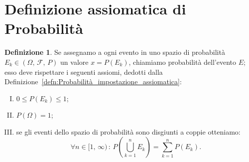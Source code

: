 \documentclass[12pt,openany]{amsbook}
\theoremstyle{plain}
\numberwithin{equation}{section} %
\theoremstyle{definition}
\newtheorem{defn}[thm]{Definizione}
\begin{document}
        \section{Definizione assiomatica di Probabilità}
            \begin{defn}
                Se assegnamo a ogni evento in uno spazio di probabilità $E_k \in (\Omega,\,\mathscr{F},\,P)$ un valore $x = P(E_k)$, chiamiamo probabilità dell'evento $E$; esso deve rispettare i seguenti assiomi, dedotti dalla Definizione~\ref{defn:Probabilità_impostazione_assiomatica}:
                \begin{enumerate}[I)]
                    \item $0 \leq P(E_k) \leq 1$;
                    \item $P(\Omega) = 1$;
                    \item  se gli eventi dello spazio di probabilità sono disgiunti a coppie otteniamo: \[
                    \forall n \in [1,\,\infty)\,:\,P(\bigcup_{k=1}^{n} E_k) = \sum_{k=1}^{n} P(E_k)
                    .\] 
                \end{enumerate}
            \end{defn}
\end{document}
